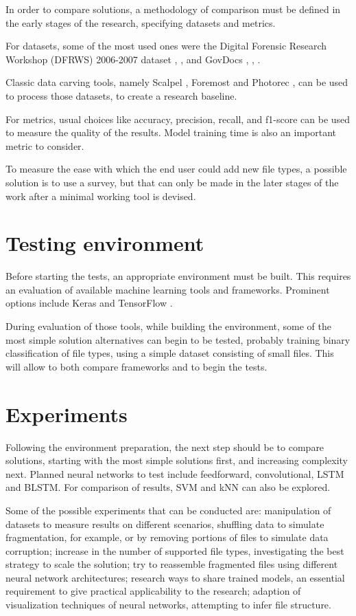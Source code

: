 In order to compare solutions, a methodology of comparison must be defined in the early stages of the research, specifying datasets and metrics.

For datasets, some of the most used ones were the Digital Forensic Research Workshop (DFRWS) 2006-2007 dataset \cite{qiu_new_2014}, \cite{ali_review_2018}, and GovDocs \cite{hiester_file_2018}, \cite{fitzgerald_using_2012}, \cite{beebe_sceadan:_2013}.

Classic data carving tools, namely Scalpel \cite{richard_iii_scalpel:_2005}, Foremost \cite{kendall_foremost_2019} and Photorec \cite{grenier_photorec_2019}, can be used to process those datasets, to create a research baseline.

For metrics, usual choices like accuracy, precision, recall, and f1-score can be used to measure the quality of the results. Model training time is also an important metric to consider.

To measure the ease with which the end user could add new file types, a possible solution is to use a survey, but that can only be made in the later stages of the work after a minimal working tool is devised.


\section{Testing environment}
Before starting the tests, an appropriate environment must be built. This requires an evaluation of available machine learning tools and frameworks. Prominent options include Keras \cite{chollet_keras_2019} and TensorFlow \cite{google_brain_tensorflow_2019}.

During evaluation of those tools, while building the environment, some of the most simple solution alternatives can begin to be tested, probably training binary classification of file types, using a simple dataset consisting of small files. This will allow to both compare frameworks and to begin the tests.

\section{Experiments}
Following the environment preparation, the next step should be to compare solutions, starting with the most simple solutions first, and increasing complexity next. Planned neural networks to test include feedforward, convolutional, LSTM and BLSTM. For comparison of results, SVM and kNN can also be explored.

Some of the possible experiments that can be conducted are: 
%
manipulation of datasets to measure results on different scenarios,  shuffling data to simulate fragmentation, for example, or by removing portions of files to simulate data corruption;
%
increase in the number of supported file types, investigating the best strategy to scale the solution;
%
try to reassemble fragmented files using different neural network architectures;
%
research ways to share trained models, an essential requirement to give practical applicability to the research;
%
adaption of visualization techniques of neural networks, attempting to infer file structure.
